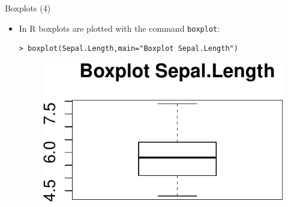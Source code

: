 \documentclass[handout]{beamer}
\begin{document}
\begin{frame}[fragile]{Boxplots (4)}
\scriptsize{
\begin{itemize}
 \item In R boxplots are plotted with the command \verb+boxplot+:
 \begin{verbatim}
> boxplot(Sepal.Length,main="Boxplot Sepal.Length")
 \end{verbatim}

 \begin{figure}[h!]
	\centering
	\includegraphics[scale=0.7]{pics/boxplotsimple.pdf}		
\end{figure} 
 
 
\end{itemize}



}
\end{frame}
\end{document}
